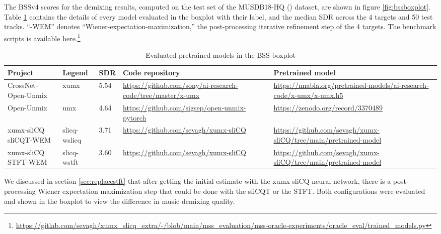 \documentclass[report.tex]{subfiles}
\begin{document}
The BSSv4 scores for the demixing results, computed on the test set of the MUSDB18-HQ (\cite{musdb18hq}) dataset, are shown in figure \ref{fig:bssboxplot}. Table \ref{table:bsseval} contains the details of every model evaluated in the boxplot with their label, and the median SDR across the 4 targets and 50 test tracks. ``-WEM'' denotes ``Wiener-expectation-maximization,'' the post-processing iterative refinement step of the 4 targets. The benchmark scripts is available here.\footnote{\url{https://gitlab.com/sevagh/xumx_slicq_extra/-/blob/main/mss_evaluation/mss-oracle-experiments/oracle_eval/trained_models.py}}

\begin{table}[ht]
	\centering
	\begin{tabular}{ |p{2.5cm}|l|l|p{3.5cm}|p{3.5cm}| }
	 \hline
		Project & Legend & SDR & Code repository & Pretrained model \\
	 \hline
	 \hline
		CrossNet-Open-Unmix & xumx & 5.54 & \url{https://github.com/sony/ai-research-code/tree/master/x-umx} & \url{https://nnabla.org/pretrained-models/ai-research-code/x-umx/x-umx.h5} \\
	 \hline
		Open-Unmix & umx & 4.64 & \url{https://github.com/sigsep/open-unmix-pytorch} & \url{https://zenodo.org/record/3370489} \\
	 \hline
		\makecell[l]{xumx-sliCQ \\ sliCQT-WEM} & slicq-wslicq & 3.71 & \url{https://github.com/sevagh/xumx-sliCQ} & \url{https://github.com/sevagh/xumx-sliCQ/tree/main/pretrained-model} \\
	 \hline
		\makecell[l]{xumx-sliCQ \\ STFT-WEM} & slicq-wstft & 3.60 & \url{https://github.com/sevagh/xumx-sliCQ} & \url{https://github.com/sevagh/xumx-sliCQ/tree/main/pretrained-model} \\
	 \hline
\end{tabular}
	\caption{Evaluated pretrained models in the BSS boxplot}
	\label{table:bsseval}
\end{table}

We discussed in section \ref{sec:replacestft} that after getting the initial estimate with the xumx-sliCQ neural network, there is a post-processing Wiener expectation maximization step that could be done with the sliCQT or the STFT. Both configurations were evaluated and shown in the boxplot to view the difference in music demixing quality.
\end{document}
